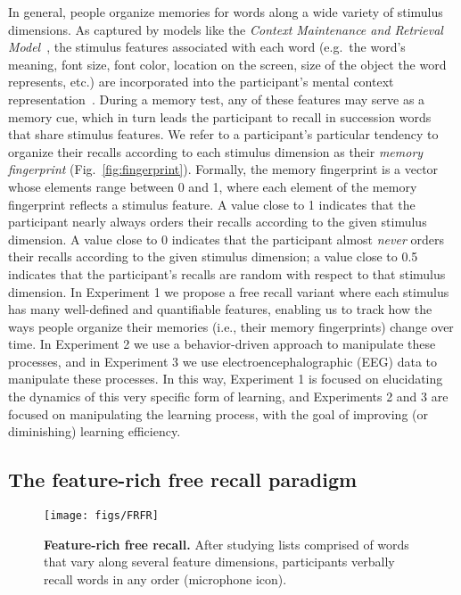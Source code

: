 In general, people organize memories for words along a wide variety of stimulus
dimensions. As captured by models like the \textit{Context Maintenance and
Retrieval Model}~\citep{PolyEtal09}, the stimulus features associated with each
word (e.g.\ the word's meaning, font size, font color, location on the screen,
size of the object the word represents, etc.) are incorporated into the
participant's mental context representation~\citep[also see][]{SmitVela01,
MannEtal15}. During a memory test, any of these features may serve as a memory
cue, which in turn leads the participant to recall in succession words that
share stimulus features. We refer to a participant's particular tendency to
organize their recalls according to each stimulus dimension as their
\textit{memory fingerprint} (Fig.~\ref{fig:fingerprint}). Formally, the memory
fingerprint is a vector whose elements range between 0 and 1, where each
element of the memory fingerprint reflects a stimulus feature. A value close to
1 indicates that the participant nearly always orders their recalls according
to the given stimulus dimension. A value close to 0 indicates that the
participant almost \textit{never} orders their recalls according to the given
stimulus dimension; a value close to 0.5 indicates that the participant's
recalls are random with respect to that stimulus dimension. In Experiment 1 we
propose a free recall variant where each stimulus has many well-defined and
quantifiable features, enabling us to track how the ways people organize their
memories (i.e., their memory fingerprints) change over time. In Experiment 2 we
use a behavior-driven approach to manipulate these processes, and in Experiment
3 we use electroencephalographic (EEG) data to manipulate these processes. In
this way, Experiment 1 is focused on elucidating the dynamics of this very
specific form of learning, and Experiments 2 and 3 are focused on manipulating
the learning process, with the goal of improving (or diminishing) learning
efficiency.


\subsection*{The feature-rich free recall paradigm}

\begin{wrapfigure}[10]{r}{1.4in} \vspace{-57pt} \begin{center}
\texttt{[image: figs/FRFR]} \end{center} \vspace{-16pt}
\caption{\footnotesize \textbf{Feature-rich free recall.} After studying lists
comprised of words that vary along several feature dimensions, participants
verbally recall words in any order (microphone icon).} \label{fig:exp1}
\end{wrapfigure}

